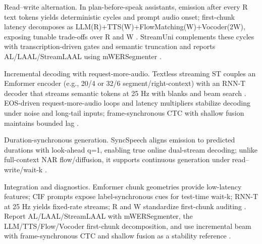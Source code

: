 \documentclass{article}
\begin{document}
Read--write alternation. In plan-before-speak assistants, emission after every R text tokens yields deterministic cycles and prompt audio onset; first-chunk latency decomposes as LLM(R)+TTS(W)+FlowMatching(W)+Vocoder(2W), exposing tunable trade-offs over R and W \cite{fang2025llamaomni2llmbasedrealtimespokenchatbota}. StreamUni complements these cycles with transcription-driven gates and semantic truncation and reports AL/LAAL/StreamLAAL using mWERSegmenter \cite{guo2025streamuniachievingstreamingspeechtransla}.

Incremental decoding with request-more-audio. Textless streaming ST couples an Emformer encoder (e.g., 20/4 or 32/6 segment/right-context) with an RNN-T decoder that streams semantic tokens at 25 Hz with blanks and beam search \cite{zhao2024textlessstreamingspeechtranslationsemant}. EOS-driven request-more-audio loops and latency multipliers stabilize decoding under noise and long-tail inputs; frame-synchronous CTC with shallow fusion maintains bounded lag \cite{ouyang2025cmusiwslt2025simultaneousspeechtranslati,deng2025simuls2sllmunlockingsimultaneousinferenc}.

Duration-synchronous generation. SyncSpeech aligns emission to predicted durations with look-ahead q=1, enabling true online dual-stream decoding; unlike full-context NAR flow/diffusion, it supports continuous generation under read--write/wait-k \cite{sheng2025syncspeechlowlatencyefficientdualstreamt}.

Integration and diagnostics. Emformer chunk geometries provide low-latency features; CIF prompts expose label-synchronous cues for test-time wait-k; RNN-T at 25 Hz yields fixed-rate streams; R and W standardize first-chunk auditing \cite{zhao2024textlessstreamingspeechtranslationsemant,deng2025simuls2sllmunlockingsimultaneousinferenc,fang2025llamaomni2llmbasedrealtimespokenchatbota}. Report AL/LAAL/StreamLAAL with mWERSegmenter, the LLM/TTS/Flow/Vocoder first-chunk decomposition, and use incremental beam with frame-synchronous CTC and shallow fusion as a stability reference \cite{guo2025streamuniachievingstreamingspeechtransla,deng2025simuls2sllmunlockingsimultaneousinferenc,fang2025llamaomni2llmbasedrealtimespokenchatbota}.
\end{document}
